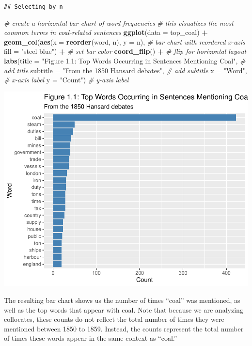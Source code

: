 \documentclass[
]{article}
\newenvironment{Shaded}{\begin{snugshade}}{\end{snugshade}}
\newcommand{\AttributeTok}[1]{\textcolor[rgb]{0.13,0.29,0.53}{#1}}
\newcommand{\CommentTok}[1]{\textcolor[rgb]{0.56,0.35,0.01}{\textit{#1}}}
\newcommand{\FunctionTok}[1]{\textcolor[rgb]{0.13,0.29,0.53}{\textbf{#1}}}
\newcommand{\NormalTok}[1]{#1}
\newcommand{\SpecialCharTok}[1]{\textcolor[rgb]{0.81,0.36,0.00}{\textbf{#1}}}
\newcommand{\StringTok}[1]{\textcolor[rgb]{0.31,0.60,0.02}{#1}}
\begin{document}
\begin{verbatim}
## Selecting by n
\end{verbatim}

\begin{Shaded}
\begin{Highlighting}[]
\CommentTok{\# create a horizontal bar chart of word frequencies}
\CommentTok{\# this visualizes the most common terms in coal{-}related sentences}
\FunctionTok{ggplot}\NormalTok{(}\AttributeTok{data =}\NormalTok{ top\_coal) }\SpecialCharTok{+}  
  \FunctionTok{geom\_col}\NormalTok{(}\FunctionTok{aes}\NormalTok{(}\AttributeTok{x =} \FunctionTok{reorder}\NormalTok{(word, n), }\AttributeTok{y =}\NormalTok{ n), }\CommentTok{\# bar chart with reordered x{-}axis}
           \AttributeTok{fill =} \StringTok{"steel blue"}\NormalTok{) }\SpecialCharTok{+} \CommentTok{\# set bar color}
  \FunctionTok{coord\_flip}\NormalTok{() }\SpecialCharTok{+} \CommentTok{\# flip for horizontal layout}
  \FunctionTok{labs}\NormalTok{(}\AttributeTok{title =} \StringTok{"Figure 1.1: Top Words Occurring in Sentences Mentioning Coal"}\NormalTok{, }\CommentTok{\# add title}
       \AttributeTok{subtitle =} \StringTok{"From the 1850 Hansard debates"}\NormalTok{, }\CommentTok{\# add subtitle}
       \AttributeTok{x =} \StringTok{"Word"}\NormalTok{, }\CommentTok{\# x{-}axis label}
       \AttributeTok{y =} \StringTok{"Count"}\NormalTok{) }\CommentTok{\# y{-}axis label}
\end{Highlighting}
\end{Shaded}

\includegraphics[width=0.8\linewidth]{ch1-11.25.2024_files/figure-latex/unnamed-chunk-29-1}

The resulting bar chart shows us the number of times ``coal'' was
mentioned, as well as the top words that appear with coal. Note that
because we are analyzing collocates, these counts do not reflect the
total number of times they were mentioned between 1850 to 1859. Instead,
the counts represent the total number of times these words appear in the
same context as ``coal.''
\end{document}
